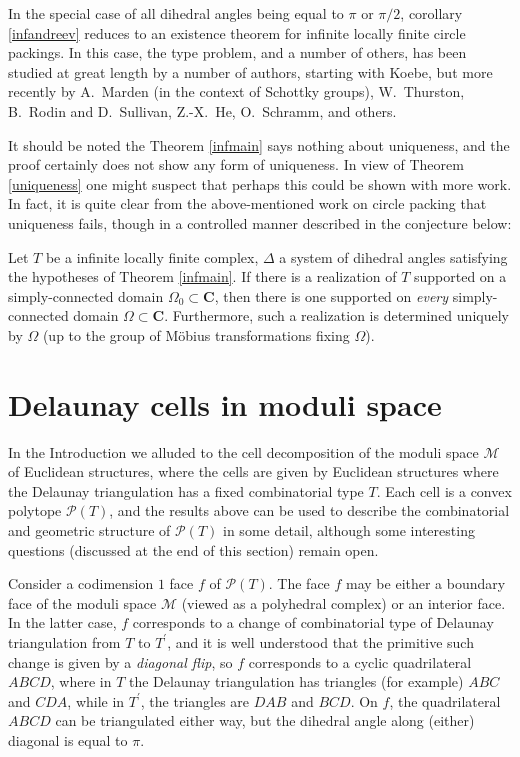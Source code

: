\documentclass{acmart}
\newcommand{\thm}[2]{\begin{#1} #2 \end{#1}}
\begin{document}
In the special case of all dihedral angles being equal to $\pi$ or
$\pi/2$, corollary \ref{infandreev} reduces to an existence theorem
for infinite  locally finite circle packings. In this case, the type
problem, and a number of others, has been studied at great length by a
number of authors, starting with Koebe, but more recently by A.~Marden
(in the context of Schottky groups), W.~Thurston, B.~Rodin and
D.~Sullivan, Z.-X.~He, O.~Schramm, and others. 

It should be noted the Theorem \ref{infmain} says nothing about
uniqueness, and the proof certainly does not show any form of
uniqueness. In view of Theorem \ref{uniqueness} one might suspect that
perhaps this could be shown with more work. In fact, it is quite clear
from the above-mentioned work on circle packing that uniqueness fails,
though in a controlled manner described in the conjecture below:

\thm{conjecture}
{
Let $T$ be a infinite locally finite complex, $\Delta$ a system of
dihedral angles satisfying the hypotheses of Theorem \ref{infmain}. If
there is a realization of $T$ supported on a simply-connected domain
$\Omega_0 \subset \mathbf{C}$, then there is one supported on \emph{every}
simply-connected domain $\Omega \subset \mathbf{C}$. Furthermore, such
a realization is determined uniquely by $\Omega$ (up to the group of
M\"obius transformations fixing $\Omega$).
}

\section{Delaunay cells in moduli space}
\label{moduli}
In the Introduction we alluded to the cell decomposition of the moduli
space $\mathcal{M}$ of Euclidean structures, where the cells are given
by Euclidean structures where the Delaunay triangulation has a fixed
combinatorial type $T$. Each cell is a convex polytope
$\mathcal{P}(T)$, and the results above can be used to describe the
combinatorial and geometric structure of $\mathcal{P}(T)$ in some
detail, although some interesting questions (discussed at the end of
this section) remain  open. 

Consider a codimension $1$ face $f$ of $\mathcal{P}(T)$. The face $f$
may be either  a boundary face of the moduli space $\mathcal{M}$
(viewed as a polyhedral complex) or an interior face. In the latter
case, $f$ corresponds to a change of combinatorial type of Delaunay
triangulation from $T$ to $T^\prime$, and it is well understood that
the primitive such change is given by a \emph{diagonal flip}, so $f$
corresponds to a cyclic quadrilateral $ABCD$, where in $T$ the
Delaunay triangulation has triangles (for example) $ABC$ and $CDA$,
while in $T^\prime$, the triangles are $DAB$ and $BCD$. On $f$, the
quadrilateral $ABCD$ can be triangulated either way, but the dihedral
angle along (either) diagonal is equal to $\pi$.
\end{document}
